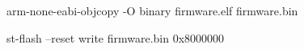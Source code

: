 arm-none-eabi-objcopy -O binary firmware.elf firmware.bin 

st-flash --reset write firmware.bin 0x8000000


